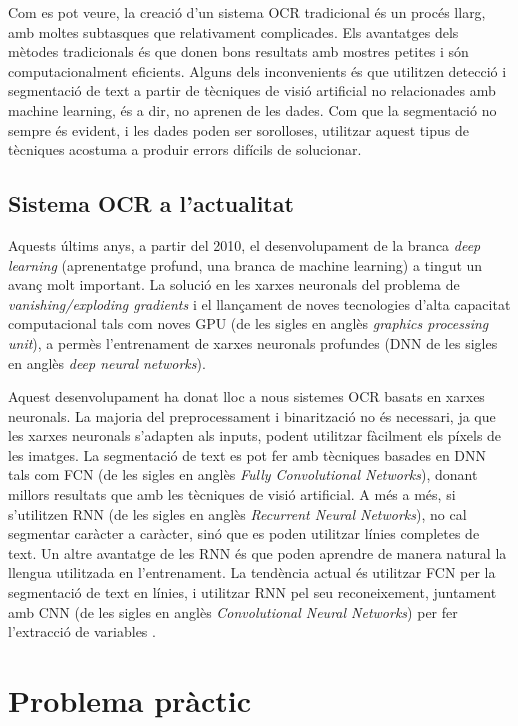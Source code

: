 \documentclass[12pt, spanish]{article}
\begin{document}
Com es pot veure, la creació d'un sistema OCR tradicional és un procés llarg, amb moltes subtasques que relativament complicades. Els avantatges dels mètodes tradicionals és que donen bons resultats amb mostres petites i són computacionalment eficients. Alguns dels inconvenients és que utilitzen detecció i segmentació de text a partir de tècniques de visió artificial no relacionades amb machine learning, és a dir, no aprenen de les dades. Com que la segmentació no sempre és evident, i les dades poden ser sorolloses, utilitzar aquest tipus de tècniques acostuma a produir errors difícils de solucionar.


\subsection{Sistema OCR a l'actualitat}

Aquests últims anys, a partir del 2010, el desenvolupament de la branca \textit{deep learning} (aprenentatge profund, una branca de machine learning) a tingut un avanç molt important. La solució en les xarxes neuronals del problema de \textit{vanishing/exploding gradients} i el llançament de noves tecnologies d'alta capacitat computacional tals com noves GPU (de les sigles en anglès \textit{graphics processing unit}), a permès l'entrenament de xarxes neuronals profundes (DNN de les sigles en anglès \textit{deep neural networks}).

Aquest desenvolupament ha donat lloc a nous sistemes OCR basats en xarxes neuronals. La majoria del preprocessament i binarització no és necessari, ja que les xarxes neuronals s'adapten als inputs, podent utilitzar fàcilment els píxels de les imatges. La segmentació de text es pot fer amb tècniques basades en DNN tals com FCN (de les sigles en anglès \textit{Fully Convolutional Networks}), donant millors resultats que amb les tècniques de visió artificial. A més a més, si s'utilitzen RNN (de les sigles en anglès \textit{Recurrent Neural Networks}), no cal segmentar caràcter a caràcter, sinó que es poden utilitzar línies completes de text. Un altre avantatge de les RNN és que poden aprendre de manera natural la llengua utilitzada en l'entrenament. La tendència actual és utilitzar FCN per la segmentació de text en línies, i utilitzar RNN pel seu reconeixement, juntament amb CNN (de les sigles en anglès \textit{Convolutional Neural Networks}) per fer l'extracció de variables \cite{martinek2020building}.

\clearpage
\section{Problema pràctic}
\end{document}
